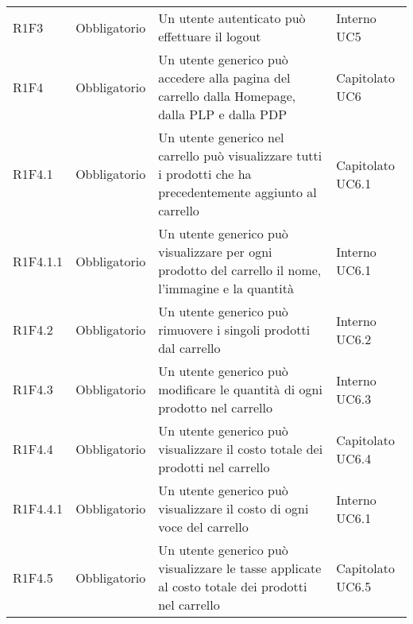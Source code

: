 {\begin{longtable}{C{2.5cm} C{2.8cm} C{6.7cm} C{2.5cm}}

R1F3 & Obbligatorio & Un utente autenticato può effettuare il logout & Interno \newline UC5 \\


R1F4 & Obbligatorio & Un utente generico può accedere alla pagina del carrello dalla Homepage, dalla PLP e dalla PDP & Capitolato \newline UC6 \\
R1F4.1 & Obbligatorio & Un utente generico nel carrello può visualizzare tutti i prodotti che ha precedentemente aggiunto al carrello & Capitolato \newline UC6.1 \\
R1F4.1.1 & Obbligatorio & Un utente generico può visualizzare per ogni prodotto del carrello il nome, l'immagine e la quantità & Interno \newline UC6.1 \\
R1F4.2 & Obbligatorio & Un utente generico può rimuovere i singoli prodotti dal carrello & Interno \newline UC6.2 \\
R1F4.3 & Obbligatorio & Un utente generico può modificare le quantità di ogni prodotto nel carrello & Interno \newline UC6.3\\
R1F4.4 & Obbligatorio & Un utente generico può visualizzare il costo totale dei prodotti nel carrello & Capitolato \newline UC6.4\\
R1F4.4.1 & Obbligatorio & Un utente generico può visualizzare il costo di ogni voce del carrello & Interno \newline UC6.1\\
R1F4.5 & Obbligatorio & Un utente generico può visualizzare le tasse applicate al costo totale dei prodotti nel carrello & Capitolato \newline UC6.5\\



\end{longtable}}
